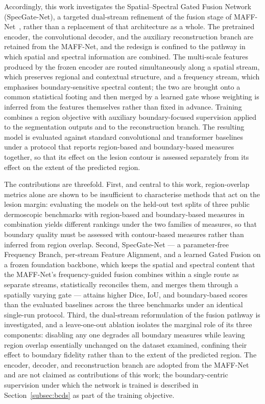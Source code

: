 Accordingly, this work investigates the Spatial--Spectral Gated Fusion Network (SpecGate-Net), a targeted dual-stream refinement of the fusion stage of MAFF-Net~\cite{ref15}, rather than a replacement of that architecture as a whole. The pretrained encoder, the convolutional decoder, and the auxiliary reconstruction branch are retained from the MAFF-Net, and the redesign is confined to the pathway in which spatial and spectral information are combined. The multi-scale features produced by the frozen encoder are routed simultaneously along a spatial stream, which preserves regional and contextual structure, and a frequency stream, which emphasises boundary-sensitive spectral content; the two are brought onto a common statistical footing and then merged by a learned gate whose weighting is inferred from the features themselves rather than fixed in advance. Training combines a region objective with auxiliary boundary-focused supervision applied to the segmentation outputs and to the reconstruction branch. The resulting model is evaluated against standard convolutional and transformer baselines under a protocol that reports region-based and boundary-based measures together, so that its effect on the lesion contour is assessed separately from its effect on the extent of the predicted region.

The contributions are threefold. First, and central to this work, region-overlap metrics alone are shown to be insufficient to characterise methods that act on the lesion margin: evaluating the models on the held-out test splits of three public dermoscopic benchmarks with region-based and boundary-based measures in combination yields different rankings under the two families of measures, so that boundary quality must be assessed with contour-based measures rather than inferred from region overlap. Second, SpecGate-Net --- a parameter-free Frequency Branch, per-stream Feature Alignment, and a learned Gated Fusion on a frozen foundation backbone, which keeps the spatial and spectral content that the MAFF-Net's frequency-guided fusion combines within a single route as separate streams, statistically reconciles them, and merges them through a spatially varying gate --- attains higher Dice, IoU, and boundary-based scores than the evaluated baselines across the three benchmarks under an identical single-run protocol. Third, the dual-stream reformulation of the fusion pathway is investigated, and a leave-one-out ablation isolates the marginal role of its three components: disabling any one degrades all boundary measures while leaving region overlap essentially unchanged on the dataset examined, confining their effect to boundary fidelity rather than to the extent of the predicted region. The encoder, decoder, and reconstruction branch are adopted from the MAFF-Net and are not claimed as contributions of this work; the boundary-centric supervision under which the network is trained is described in Section~\ref{subsec:bcds} as part of the training objective.

